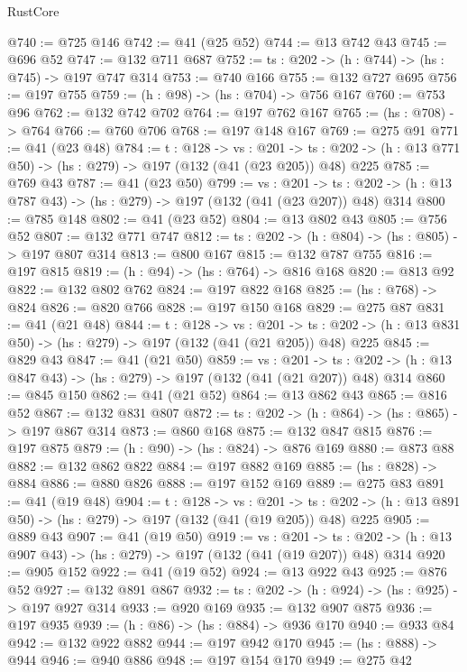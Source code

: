 \begin{lexlean}{RustCore}
\begin{coremodule}
@740 := @725 @146
@742 := @41 (@25 @52)
@744 := @13 @742 @43
@745 := @696 @52
@747 := @132 @711 @687
@752 := {ts : @202} -> (h : @744) -> (hs : @745) -> @197 @747 @314
@753 := @740 @166
@755 := @132 @727 @695
@756 := @197 @755
@759 := (h : @98) -> (hs : @704) -> @756 @167
@760 := @753 @96
@762 := @132 @742 @702
@764 := @197 @762 @167
@765 := (hs : @708) -> @764
@766 := @760 @706
@768 := @197 @148 @167
@769 := @275 @91
@771 := @41 (@23 @48)
@784 := {t : @128} ->
  {vs : @201} ->
  {ts : @202} -> (h : @13 @771 @50) -> (hs : @279) -> @197 (@132 (@41 (@23 @205)) @48) @225
@785 := @769 @43
@787 := @41 (@23 @50)
@799 := {vs : @201} ->
  {ts : @202} -> (h : @13 @787 @43) -> (hs : @279) -> @197 (@132 (@41 (@23 @207)) @48) @314
@800 := @785 @148
@802 := @41 (@23 @52)
@804 := @13 @802 @43
@805 := @756 @52
@807 := @132 @771 @747
@812 := {ts : @202} -> (h : @804) -> (hs : @805) -> @197 @807 @314
@813 := @800 @167
@815 := @132 @787 @755
@816 := @197 @815
@819 := (h : @94) -> (hs : @764) -> @816 @168
@820 := @813 @92
@822 := @132 @802 @762
@824 := @197 @822 @168
@825 := (hs : @768) -> @824
@826 := @820 @766
@828 := @197 @150 @168
@829 := @275 @87
@831 := @41 (@21 @48)
@844 := {t : @128} ->
  {vs : @201} ->
  {ts : @202} -> (h : @13 @831 @50) -> (hs : @279) -> @197 (@132 (@41 (@21 @205)) @48) @225
@845 := @829 @43
@847 := @41 (@21 @50)
@859 := {vs : @201} ->
  {ts : @202} -> (h : @13 @847 @43) -> (hs : @279) -> @197 (@132 (@41 (@21 @207)) @48) @314
@860 := @845 @150
@862 := @41 (@21 @52)
@864 := @13 @862 @43
@865 := @816 @52
@867 := @132 @831 @807
@872 := {ts : @202} -> (h : @864) -> (hs : @865) -> @197 @867 @314
@873 := @860 @168
@875 := @132 @847 @815
@876 := @197 @875
@879 := (h : @90) -> (hs : @824) -> @876 @169
@880 := @873 @88
@882 := @132 @862 @822
@884 := @197 @882 @169
@885 := (hs : @828) -> @884
@886 := @880 @826
@888 := @197 @152 @169
@889 := @275 @83
@891 := @41 (@19 @48)
@904 := {t : @128} ->
  {vs : @201} ->
  {ts : @202} -> (h : @13 @891 @50) -> (hs : @279) -> @197 (@132 (@41 (@19 @205)) @48) @225
@905 := @889 @43
@907 := @41 (@19 @50)
@919 := {vs : @201} ->
  {ts : @202} -> (h : @13 @907 @43) -> (hs : @279) -> @197 (@132 (@41 (@19 @207)) @48) @314
@920 := @905 @152
@922 := @41 (@19 @52)
@924 := @13 @922 @43
@925 := @876 @52
@927 := @132 @891 @867
@932 := {ts : @202} -> (h : @924) -> (hs : @925) -> @197 @927 @314
@933 := @920 @169
@935 := @132 @907 @875
@936 := @197 @935
@939 := (h : @86) -> (hs : @884) -> @936 @170
@940 := @933 @84
@942 := @132 @922 @882
@944 := @197 @942 @170
@945 := (hs : @888) -> @944
@946 := @940 @886
@948 := @197 @154 @170
@949 := @275 @42

\end{coremodule}
\end{lexlean}
